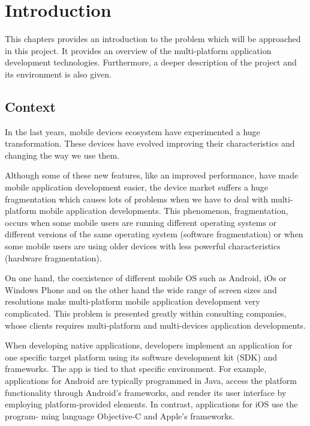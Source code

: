 \cleardoublepage
\chapter{Introduction}

\begin{chapterintro}

This chapters provides an introduction to the problem which will be approached in this project. It provides an overview of the multi-platform application development technologies. Furthermore, a deeper description of the project and its environment is also given.

\end{chapterintro}

\cleardoublepage
\section{Context}

In the last years, mobile devices ecosystem have experimented a huge transformation. These devices have evolved improving their characteristics and changing the way we use them.

Although some of these new features, like an improved performance, have made mobile application development easier, the device market suffers a huge fragmentation which causes lots of problems when we have to deal with multi-platform mobile application developments. This phenomenon, fragmentation, occurs when some mobile users are running different operating systems or different versions of the same operating system (software fragmentation) or when some mobile users are using older devices with less powerful characteristics (hardware fragmentation).

On one hand, the coexistence of different mobile OS such as Android, iOs or Windows Phone and on the other hand the wide range of screen sizes and resolutions make multi-platform mobile application development very complicated. This problem is presented greatly within consulting companies, whose clients requires multi-platform and multi-devices application developments.

When developing native applications, developers implement an application for one specific target platform using its software development kit (SDK) and frameworks. The app is tied to that specific environment. For example, applications for Android are typically programmed in Java, access the platform functionality through Android’s frameworks, and render its user interface by employing platform-provided elements. In contrast, applications for iOS use the program- ming language Objective-C and Apple’s frameworks.

